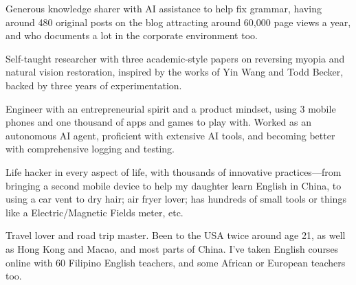 \begin{cventry}
{\begin{cvitems}
            \item {Generous knowledge sharer with AI assistance to help fix grammar, having around 480 original posts on the blog attracting around 60,000 page views a year, and who documents a lot in the corporate environment too.}
            \item {Self-taught researcher with three academic-style papers on reversing myopia and natural vision restoration, inspired by the works of Yin Wang and Todd Becker, backed by three years of experimentation.}
            \item {Engineer with an entrepreneurial spirit and a product mindset, using 3 mobile phones and one thousand of apps and games to play with. Worked as an autonomous AI agent, proficient with extensive AI tools, and becoming better with comprehensive logging and testing.}
            \item {Life hacker in every aspect of life, with thousands of innovative practices—from bringing a second mobile device to help my daughter learn English in China, to using a car vent to dry hair; air fryer lover; has hundreds of small tools or things like a Electric/Magnetic Fields meter, etc.}
            \item {Travel lover and road trip master. Been to the USA twice around age 21, as well as Hong Kong and Macao, and most parts of China. I've taken English courses online with 60 Filipino English teachers, and some African or European teachers too.}
        \end{cvitems}        
    }
\end{cventry}
